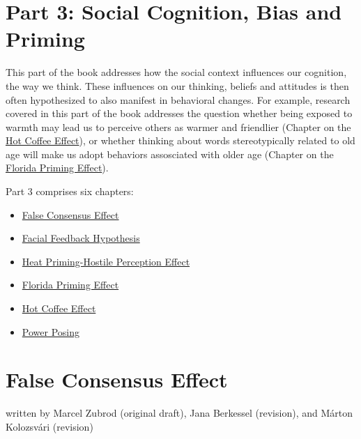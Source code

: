 \documentclass[
  letterpaper,
]{book}
\providecommand{\tightlist}{%
  \setlength{\itemsep}{0pt}\setlength{\parskip}{0pt}}\usepackage{longtable,booktabs,array}
\begin{document}

\chapter*{\texorpdfstring{{Part 3: Social Cognition, Bias and
Priming}}{Part 3: Social Cognition, Bias and Priming}}\label{part-3-social-cognition-bias-and-priming}


This part of the book addresses how the social context influences our
cognition, the way we think. These influences on our thinking, beliefs
and attitudes is then often hypothesized to also manifest in behavioral
changes. For example, research covered in this part of the book
addresses the question whether being exposed to warmth may lead us to
perceive others as warmer and friendlier (Chapter on the
\href{chapter20.qmd}{Hot Coffee Effect}), or whether thinking about
words stereotypically related to old age will make us adopt behaviors
assosciated with older age (Chapter on the \href{chapter19.qmd}{Florida
Priming Effect}).

Part 3 comprises six chapters:

\begin{itemize}
\tightlist
\item
  \href{chapter16.qmd}{False Consensus Effect}
\item
  \href{chapter17.qmd}{Facial Feedback Hypothesis}
\item
  \href{chapter18.qmd}{Heat Priming-Hostile Perception Effect}
\item
  \href{chapter19.qmd}{Florida Priming Effect}
\item
  \href{chapter20.qmd}{Hot Coffee Effect}
\item
  \href{chapter27.qmd}{Power Posing}
\end{itemize}


\chapter{\texorpdfstring{{False Consensus
Effect}}{False Consensus Effect}}\label{false-consensus-effect}

{written by Marcel Zubrod (original draft), Jana Berkessel (revision),
and Márton Kolozsvári (revision)}
\end{document}
